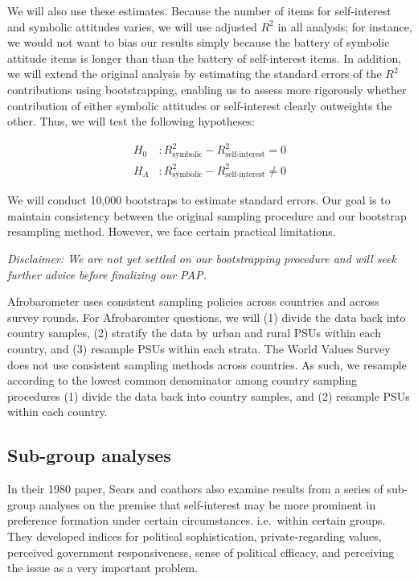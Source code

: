 \documentclass[]{article}
\begin{document}
We will also use these estimates. Because the number of items for
self-interest and symbolic attitudes varies, we will use adjusted
\(R^2\) in all analysis; for instance, we would not want to bias our
results simply because the battery of symbolic attitude items is longer
than than the battery of self-interest items. In addition, we will
extend the original analysis by estimating the standard errors of the
\(R^2\) contributions using bootstrapping, enabling us to assess more
rigorously whether contribution of either symbolic attitudes or
self-interest clearly outweights the other. Thus, we will test the
following hypotheses:

\[\begin{aligned}
H_0 \ &: R^2_{\text{symbolic}} - R^2_{\text{self-interest}} = 0\\ H_A&: R^2_{\text{symbolic}} - R^2_{\text{self-interest}} \neq 0
\end{aligned}\]

We will conduct 10,000 bootstraps to estimate standard errors. Our goal
is to maintain consistency between the original sampling procedure and
our bootstrap resampling method. However, we face certain practical
limitations.

\textit{Disclaimer: We are not yet settled on our bootstrapping procedure and will seek further advice before finalizing our PAP.}

Afrobarometer uses consistent sampling policies across countries and
across survey rounds. For Afrobaromter questions, we will (1) divide the
data back into country samples, (2) stratify the data by urban and rural
PSUs within each country, and (3) resample PSUs within each strata. The
World Values Survey does not use consistent sampling methods across
countries. As such, we resample according to the lowest common
denominator among country sampling procedures (1) divide the data back
into country samples, and (2) resample PSUs within each country.

\subsection{Sub-group analyses}\label{sub-group-analyses}

In their 1980 paper, Sears and coathors also examine results from a
series of sub-group analyses on the premise that self-interest may be
more prominent in preference formation under certain circumstances.
i.e.~within certain groups. They developed indices for political
sophistication, private-regarding values, perceived government
responsiveness, sense of political efficacy, and perceiving the issue as
a very important problem.
\end{document}
